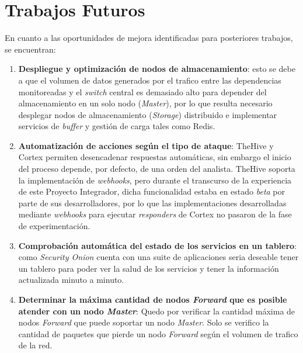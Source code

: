 \chapter{\Large Trabajos Futuros }
En cuanto a las oportunidades de mejora identificadas para posteriores trabajos, se encuentran:

\begin{enumerate}
    \item \textbf{Despliegue y optimización de nodos de almacenamiento}: esto se debe a que el volumen de datos generados por el trafico entre las dependencias monitoreadas y el \textit{switch} central es demasiado alto para depender del almacenamiento en un solo nodo (\textit{Master}), por lo que resulta necesario desplegar nodos de almacenamiento (\textit{Storage}) distribuido e implementar servicios de \textit{buffer} y gestión de carga tales como Redis.
    
    \item \textbf{Automatización de acciones según el tipo de ataque}: TheHive y Cortex permiten desencadenar respuestas automáticas, sin embargo el inicio del proceso depende, por defecto, de una orden del analista. TheHive soporta la implementación de \textit{webhooks}, pero durante el transcurso de la experiencia de este Proyecto Integrador, dicha funcionalidad estaba en estado \textit{beta} por parte de sus desarrolladores, por lo que las implementaciones desarrolladas mediante \textit{webhooks} para ejecutar \textit{responders} de Cortex no pasaron de la fase de experimentación.
    
    \item \textbf{Comprobación automática del estado de los servicios en un tablero}: como \textit{Security Onion} cuenta con una suite de aplicaciones seria deseable tener un tablero para poder ver la salud de los servicios y tener la información actualizada minuto a minuto.
    
    \item \textbf{Determinar la máxima cantidad de nodos \textit{Forward} que es posible atender con un nodo \textit{Master}}: Quedo por verificar la cantidad máxima de nodos \textit{Forward} que puede soportar un nodo \textit{Master}. Solo se verifico la cantidad de paquetes que pierde un nodo \textit{Forward} según el volumen de trafico de la red. 

\end{enumerate}
 